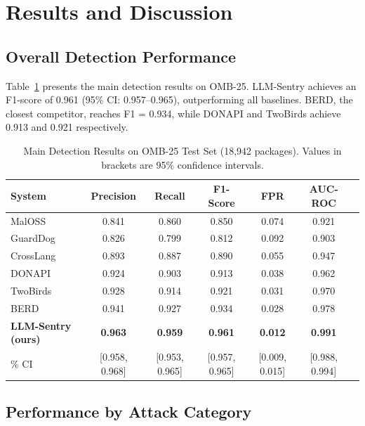 \documentclass[conference]{IEEEtran}
\begin{document}
\section{Results and Discussion}
\label{sec:results}

\subsection{Overall Detection Performance}

Table~\ref{tab:results_main} presents the main detection results on OMB-25. LLM-Sentry achieves an F1-score of 0.961 (95\% CI: 0.957--0.965), outperforming all baselines. BERD, the closest competitor, reaches F1 = 0.934, while DONAPI and TwoBirds achieve 0.913 and 0.921 respectively.

\begin{table}[t]
\caption{Main Detection Results on OMB-25 Test Set (18,942 packages). Values in brackets are 95\% confidence intervals.}
\label{tab:results_main}
\centering
\small
\begin{tabular}{lcccccc}
\toprule
\textbf{System} & \textbf{Precision} & \textbf{Recall} & \textbf{F1-Score} & \textbf{FPR} & \textbf{AUC-ROC} \\
\midrule
MalOSS \cite{sejfia2022practical}     & 0.841 & 0.860 & 0.850 & 0.074 & 0.921 \\
GuardDog \cite{guarddog2023msr}       & 0.826 & 0.799 & 0.812 & 0.092 & 0.903 \\
CrossLang \cite{crosslang2023acsac}   & 0.893 & 0.887 & 0.890 & 0.055 & 0.947 \\
DONAPI \cite{donapi2024usenix}        & 0.924 & 0.903 & 0.913 & 0.038 & 0.962 \\
TwoBirds \cite{twobirdstone2024tosem} & 0.928 & 0.914 & 0.921 & 0.031 & 0.970 \\
BERD \cite{berd2026www}               & 0.941 & 0.927 & 0.934 & 0.028 & 0.978 \\
\midrule
\textbf{LLM-Sentry (ours)} & \textbf{0.963} & \textbf{0.959} & \textbf{0.961} & \textbf{0.012} & \textbf{0.991} \\
\quad 95\% CI              & [0.958, 0.968] & [0.953, 0.965] & [0.957, 0.965] & [0.009, 0.015] & [0.988, 0.994] \\
\bottomrule
\end{tabular}
\end{table}

\subsection{Performance by Attack Category}
\end{document}

